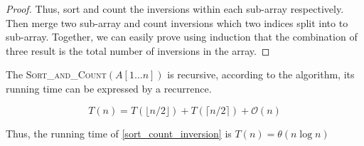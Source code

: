 \begin{homeworkProblem}
\begin{proof}
    Thus, sort and count the inversions within each sub-array respectively. Then merge two
    sub-array and count inversions which two indices split into to sub-array.
    Together, we can easily prove using induction that the combination of
    three result is the total number of inversions in the array.
\end{proof}

The \textsc{Sort\_and\_Count}$(A[1 \ldots n])$ is recursive, according to the algorithm,
its running time can be expressed by a recurrence.

\begin{equation}
    T(n) = T(\lfloor n/2 \rfloor) + T(\lceil n/2 \rceil) + \mathcal{O}(n)
\end{equation}

Thus, the running time of \cref{sort_count_inversion} is $T(n) = \theta(n \log n)$

\end{homeworkProblem}
